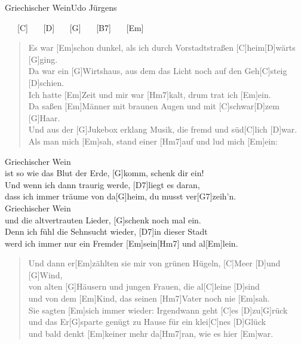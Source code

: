 \begin{song}{Griechischer Wein}{Udo J\"urgens}

    \begin{intro}
        [Em] \ \ \ [C] \ \ \ [D] \ \ \ [G] \ \ \ [B7] \ \ \ [Em]
    \end{intro}

    \begin{verse}  
        Es war [Em]schon dunkel, als ich durch Vorstadtstraßen [C]heim[D]wärts [G]ging. \\
        Da war ein [G]Wirtshaus, aus dem das Licht noch auf den Geh[C]steig [D]schien. \\
        [H7]Ich hatte [Em]Zeit und mir war [Hm7]kalt, drum trat ich [Em]ein. \\
        Da saßen [Em]Männer mit braunen Augen und mit [C]schwar[D]zem [G]Haar. \\
        Und aus der [G]Jukebox erklang Musik, die fremd und süd[C]lich [D]war. \\
        [H7]Als man mich [Em]sah, stand einer [Hm7]auf und lud mich [Em]ein:
    \end{verse}  

    \begin{chorus}
        [C]Griechischer Wein \\
        ist so wie das Blut der Erde,
        [G]komm, schenk dir ein! \\
        Und wenn ich dann traurig werde, [D7]liegt es daran, \\
        dass ich immer träume von da[G]heim, du musst ver[G7]zeih'n. \\
        [C]Griechischer Wein \\
        und die altvertrauten Lieder, [G]schenk noch mal ein. \\
        Denn ich fühl die Sehnsucht wieder, [D7]in dieser Stadt \\
        werd ich immer nur ein Fremder [Em]sein[Hm7] und al[Em]lein.
    \end{chorus}

    \begin{verse}  
        Und dann er[Em]zählten sie mir von grünen Hügeln, [C]Meer [D]und [G]Wind, \\
        von alten [G]Häusern und jungen Frauen, die al[C]leine [D]sind \\
        [H7] und von dem [Em]Kind, das seinen [Hm7]Vater noch nie [Em]sah. \\
        Sie sagten [Em]sich immer wieder: Irgendwann geht [C]es [D]zu[G]rück \\
        und das Er[G]sparte genügt zu Hause für ein klei[C]nes [D]Glück \\
        [H7] und bald denkt [Em]keiner mehr da[Hm7]ran, wie es hier [Em]war.
    \end{verse}  


\end{song}
